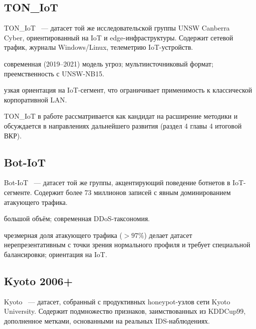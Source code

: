 \subsection{TON\_IoT}

TON\_IoT~\cite{moustafa2021toniot} ---  датасет той же исследовательской
группы UNSW Canberra Cyber, ориентированный на IoT и edge-инфраструктуры.
Содержит сетевой трафик, журналы Windows/Linux, телеметрию IoT-устройств.

\begin{description}[font=\normalfont\itshape, leftmargin=1.5em]
    \item[Сильные стороны:] современная (2019--2021) модель угроз;
    мультиисточниковый формат; преемственность с UNSW-NB15.
    \item[Ограничения:] узкая ориентация на IoT-сегмент, что ограничивает
    применимость к классической корпоративной LAN.
\end{description}

TON\_IoT в работе рассматривается как кандидат на расширение методики и
обсуждается в направлениях дальнейшего развития (раздел 4 главы 4 итоговой ВКР).

\subsection{Bot-IoT}

Bot-IoT~\cite{koroniotis2019botiot} --- датасет той же группы, акцентирующий
поведение ботнетов в IoT-сегменте. Содержит более 73 миллионов записей с
явным доминированием атакующего трафика.

\begin{description}[font=\normalfont\itshape, leftmargin=1.5em]
    \item[Сильные стороны:] большой объём; современная DDoS-таксономия.
    \item[Ограничения:] чрезмерная доля атакующего трафика (\(>97\%\)) делает
    датасет нерепрезентативным с точки зрения нормального профиля и требует
    специальной балансировки; ориентация на IoT.
\end{description}

\subsection{Kyoto 2006+}

Kyoto~\cite{song2011kyoto} --- датасет, собранный с продуктивных honeypot-узлов
сети Kyoto University. Содержит подмножество признаков, заимствованных из
KDDCup99, дополненное метками, основанными на реальных IDS-наблюдениях.

